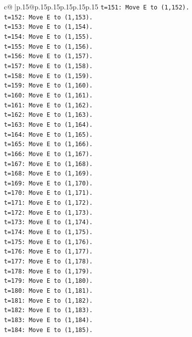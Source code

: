\documentclass{article}
\begin{document}
{\begin{supertabular}{c@{$\;$}|p{.15\linewidth}@{}p{.15\linewidth}p{.15\linewidth}p{.15\linewidth}p{.15\linewidth}p{.15\linewidth}}
{{{\texttt{t=151: Move E to (1,152).} \\
\texttt{t=152: Move E to (1,153).} \\
\texttt{t=153: Move E to (1,154).} \\
\texttt{t=154: Move E to (1,155).} \\
\texttt{t=155: Move E to (1,156).} \\
\texttt{t=156: Move E to (1,157).} \\
\texttt{t=157: Move E to (1,158).} \\
\texttt{t=158: Move E to (1,159).} \\
\texttt{t=159: Move E to (1,160).} \\
\texttt{t=160: Move E to (1,161).} \\
\texttt{t=161: Move E to (1,162).} \\
\texttt{t=162: Move E to (1,163).} \\
\texttt{t=163: Move E to (1,164).} \\
\texttt{t=164: Move E to (1,165).} \\
\texttt{t=165: Move E to (1,166).} \\
\texttt{t=166: Move E to (1,167).} \\
\texttt{t=167: Move E to (1,168).} \\
\texttt{t=168: Move E to (1,169).} \\
\texttt{t=169: Move E to (1,170).} \\
\texttt{t=170: Move E to (1,171).} \\
\texttt{t=171: Move E to (1,172).} \\
\texttt{t=172: Move E to (1,173).} \\
\texttt{t=173: Move E to (1,174).} \\
\texttt{t=174: Move E to (1,175).} \\
\texttt{t=175: Move E to (1,176).} \\
\texttt{t=176: Move E to (1,177).} \\
\texttt{t=177: Move E to (1,178).} \\
\texttt{t=178: Move E to (1,179).} \\
\texttt{t=179: Move E to (1,180).} \\
\texttt{t=180: Move E to (1,181).} \\
\texttt{t=181: Move E to (1,182).} \\
\texttt{t=182: Move E to (1,183).} \\
\texttt{t=183: Move E to (1,184).} \\
\texttt{t=184: Move E to (1,185).} \\
}}}
\end{supertabular}}
\end{document}
